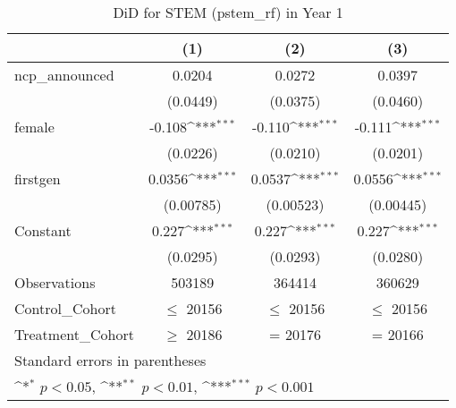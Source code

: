 \begin{table}[htbp]\centering
\def\sym#1{\ifmmode^{#1}\else\(^{#1}\)\fi}
\caption{DiD for STEM (pstem\_rf) in Year 1}
\begin{tabular}{l*{3}{c}}
\toprule
                &\multicolumn{1}{c}{(1)}         &\multicolumn{1}{c}{(2)}         &\multicolumn{1}{c}{(3)}         \\
\midrule
ncp\_announced   &   0.0204         &   0.0272         &   0.0397         \\
                & (0.0449)         & (0.0375)         & (0.0460)         \\
\addlinespace
female          &   -0.108\sym{***}&   -0.110\sym{***}&   -0.111\sym{***}\\
                & (0.0226)         & (0.0210)         & (0.0201)         \\
\addlinespace
firstgen        &   0.0356\sym{***}&   0.0537\sym{***}&   0.0556\sym{***}\\
                &(0.00785)         &(0.00523)         &(0.00445)         \\
\addlinespace
Constant        &    0.227\sym{***}&    0.227\sym{***}&    0.227\sym{***}\\
                & (0.0295)         & (0.0293)         & (0.0280)         \\
\midrule
Observations    &   503189         &   364414         &   360629         \\
Control\_Cohort  &$\le$ 20156         &$\le$ 20156         &$\le$ 20156         \\
Treatment\_Cohort&$\ge$ 20186         &  = 20176         &  = 20166         \\
\bottomrule
\multicolumn{4}{l}{\footnotesize Standard errors in parentheses}\\
\multicolumn{4}{l}{\footnotesize \sym{*} \(p<0.05\), \sym{**} \(p<0.01\), \sym{***} \(p<0.001\)}\\
\end{tabular}
\end{table}
